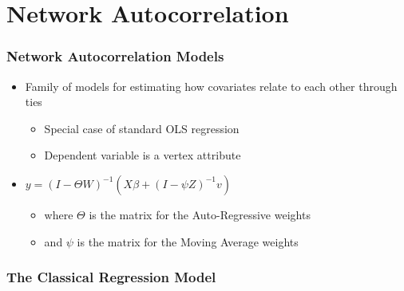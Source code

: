 \documentclass{beamer}
\begin{document}
\section{Network Autocorrelation}
\begin{frame}
\frametitle{Network Autocorrelation Models}
\begin{itemize}
\pause
\item Family of models for estimating how covariates relate to each other through ties
\begin{itemize}
\pause
\item Special case of standard OLS regression
\pause
\item Dependent variable is a vertex attribute
\pause
\end{itemize}
\item $y=(I-\Theta W)^{-1} (X\beta + (I-\psi Z)^{-1}v)$
\pause
\begin{itemize}
\item where $\Theta$ is the matrix for the Auto-Regressive weights
\pause
\item and $\psi$ is the matrix for the Moving Average weights
\end{itemize}
\end{itemize}
\end{frame}
\begin{frame}
\frametitle{The Classical Regression Model}
\end{frame}
\end{document}
